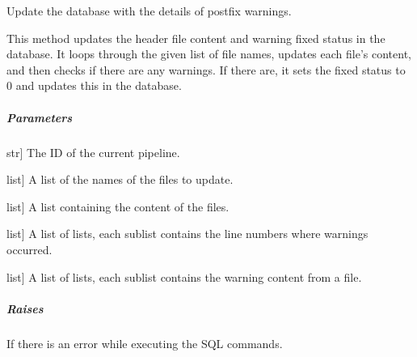 \documentclass[letterpaper,10pt,english]{sphinxmanual}
\begin{document}
\begin{fulllineitems}
\begin{fulllineitems}
\label{\detokenize{main.db_operations:main.db_operations.db_insertion_handler.DBInsertionHandler.update_post_fix_warning_details}}
\pysigstartsignatures
{}
\pysigstopsignatures
\sphinxAtStartPar
Update the database with the details of post\sphinxhyphen{}fix warnings.

\sphinxAtStartPar
This method updates the header file content and warning fixed status in the database. It loops
through the given list of file names, updates each file’s content, and then checks if there
are any warnings. If there are, it sets the fixed status to 0 and updates this in the database.


\subparagraph{Parameters}
\label{\detokenize{main.db_operations:id12}}\begin{description}
\sphinxlineitem{pipeline\_id}{[}str{]}
\sphinxAtStartPar
The ID of the current pipeline.

\sphinxlineitem{file\_name\_list}{[}list{]}
\sphinxAtStartPar
A list of the names of the files to update.

\sphinxlineitem{file\_content\_list}{[}list{]}
\sphinxAtStartPar
A list containing the content of the files.

\sphinxlineitem{line\_number\_llist}{[}list{]}
\sphinxAtStartPar
A list of lists, each sublist contains the line numbers where warnings occurred.

\sphinxlineitem{warnings\_content\_llist}{[}list{]}
\sphinxAtStartPar
A list of lists, each sublist contains the warning content from a file.

\end{description}


\subparagraph{Raises}
\label{\detokenize{main.db_operations:id13}}\begin{description}
\sphinxAtStartPar
If there is an error while executing the SQL commands.

\end{description}

\end{fulllineitems}


\end{fulllineitems}
\end{document}
